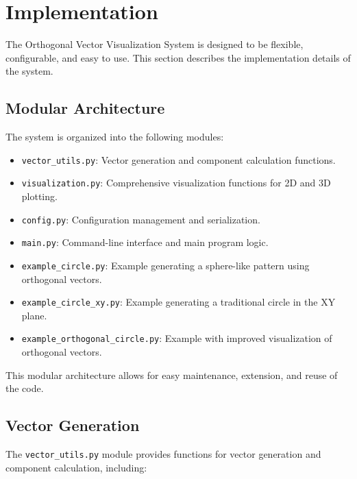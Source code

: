 \newpage
\section{Implementation}

The Orthogonal Vector Visualization System is designed to be flexible, configurable, and easy to use. This section describes the implementation details of the system.

\subsection{Modular Architecture}

The system is organized into the following modules:

\begin{itemize}
    \item \texttt{vector\_utils.py}: Vector generation and component calculation functions.
    \item \texttt{visualization.py}: Comprehensive visualization functions for 2D and 3D plotting.
    \item \texttt{config.py}: Configuration management and serialization.
    \item \texttt{main.py}: Command-line interface and main program logic.
    \item \texttt{example\_circle.py}: Example generating a sphere-like pattern using orthogonal vectors.
    \item \texttt{example\_circle\_xy.py}: Example generating a traditional circle in the XY plane.
    \item \texttt{example\_orthogonal\_circle.py}: Example with improved visualization of orthogonal vectors.
\end{itemize}

This modular architecture allows for easy maintenance, extension, and reuse of the code.

\subsection{Vector Generation}

The \texttt{vector\_utils.py} module provides functions for vector generation and component calculation, including:

